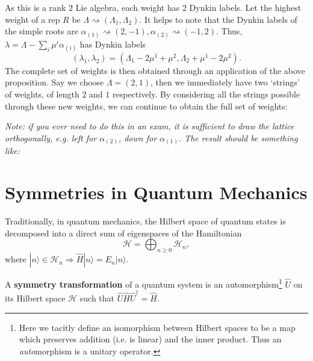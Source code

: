 \documentclass[11pt,fleqn]{article}
\begin{document}
\begin{example}
	As this is a rank $2$ Lie algebra, each weight has 2 Dynkin labels. Let the highest weight of a rep $R$ be $\Lambda \rightsquigarrow (\Lambda_1, \Lambda_2)$. It helps to note that the Dynkin labels of the simple roots are $\alpha_{(1)} \rightsquigarrow ( 2, -1), \alpha_{(2)} \rightsquigarrow (-1, 2)$. Thus, $\lambda = \Lambda - \sum_i \mu^i \alpha_{(i)}$ has Dynkin labels
		\begin{equation}
			(\lambda_1, \lambda_2) = (\Lambda_1 - 2\mu^1 + \mu^2, \Lambda_2 +\mu^1 -2\mu^2).
		\end{equation}
	The complete set of weights is then obtained through an application of the above proposition. Say we choose $\Lambda = (2,1)$, then we immediately have two `strings' of weights, of length $2$ and $1$ respectively. By considering all the strings possible through these new weights, we can continue to obtain the full set of weights:
			\begin{center}
				
			\end{center}
	\textit{Note: if you ever need to do this in an exam, it is sufficient to draw the lattice orthogonally, e.g. left for $\alpha_{(2)}$, down for $\alpha_{(1)}$. The result should be something like:}
			\begin{center}
				
			\end{center}
\end{example}

\section{Symmetries in Quantum Mechanics}

\begin{remark}
	Traditionally, in quantum mechanics, the Hilbert space of quantum states is decomposed into a direct sum of eigenspaces of the Hamiltonian
		\begin{equation}
			\mathcal{H} = \bigoplus_{n \geq 0} \mathcal{H}_n,
		\end{equation}
	where $|n\rangle \in \mathcal{H}_n \Rightarrow \hat{H}|n\rangle = E_n |n\rangle.$
\end{remark}

\begin{definition}
	A \textbf{symmetry transformation} of a quantum system is an automorphism\footnote{Here we tacitly define an isomorphism between Hilbert spaces to be a map which preserves addition (i.e. is linear) and the inner product. Thus an \textit{auto}morphism is a unitary operator.} $\hat{U}$ on its Hilbert space $\mathcal{H}$ such that $\hat{U}\hat{H}\hat{U}^\dagger = \hat{H}$.
\end{definition}
\end{document}
